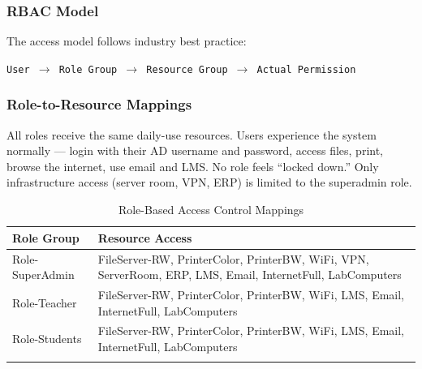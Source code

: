 ﻿\documentclass[12pt,a4paper]{article}
\begin{document}
\subsubsection{RBAC Model}

The access model follows industry best practice:

\begin{center}
\end{center}

\begin{center}
\texttt{User $\rightarrow$ Role Group $\rightarrow$ Resource Group $\rightarrow$ Actual Permission}
\end{center}

\subsubsection{Role-to-Resource Mappings}

All roles receive the same daily-use resources. Users experience the system normally --- login with their AD username and password, access files, print, browse the internet, use email and LMS. No role feels ``locked down.'' Only infrastructure access (server room, VPN, ERP) is limited to the superadmin role.

\begin{longtable}{l p{10cm}}
\toprule
\textbf{Role Group} & \textbf{Resource Access} \\
\midrule
\endhead
Role-SuperAdmin & FileServer-RW, PrinterColor, PrinterBW, WiFi, VPN, ServerRoom, ERP, LMS, Email, InternetFull, LabComputers \\
Role-Teacher & FileServer-RW, PrinterColor, PrinterBW, WiFi, LMS, Email, InternetFull, LabComputers \\
Role-Students & FileServer-RW, PrinterColor, PrinterBW, WiFi, LMS, Email, InternetFull, LabComputers \\
\bottomrule
\caption{Role-Based Access Control Mappings}
\end{longtable}
\end{document}
